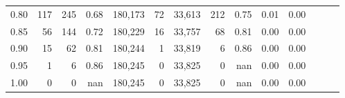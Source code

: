 \begin{tabular}{rrrrrrrrrrrrrr}
0.80 &     117 &    245 &  0.68 &  180,173 &       72 &  33,613 &     212 &  0.75 &  0.01 &      0.00 \\
0.85 &      56 &    144 &  0.72 &  180,229 &       16 &  33,757 &      68 &  0.81 &  0.00 &      0.00 \\
0.90 &      15 &     62 &  0.81 &  180,244 &        1 &  33,819 &       6 &  0.86 &  0.00 &      0.00 \\
0.95 &       1 &      6 &  0.86 &  180,245 &        0 &  33,825 &       0 &   nan &  0.00 &      0.00 \\
1.00 &       0 &      0 &   nan &  180,245 &        0 &  33,825 &       0 &   nan &  0.00 &      0.00 \\
\bottomrule
\end{tabular}
